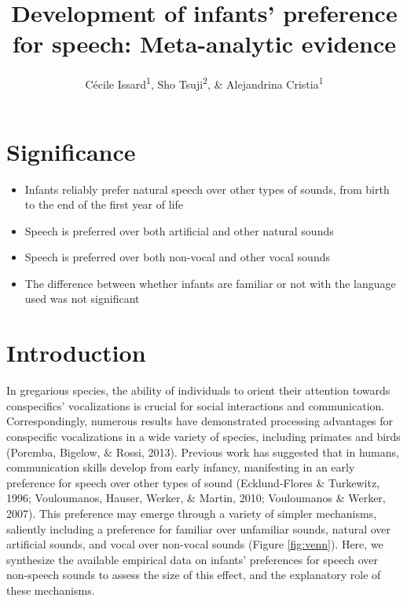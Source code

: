 \documentclass[
  man]{apa6}
\affiliation{
\vspace{0.5cm}
\textsuperscript{1} Laboratoire de Sciences Cognitives et Psycholinguistique, Ecole Normale Supérieure, Département d'Études Cognitives\\\textsuperscript{2} International Research Center for Neurointelligence, The University of Tokyo}
\title{Development of infants' preference for speech: Meta-analytic evidence}
\author{Cécile Issard\textsuperscript{1}, Sho Tsuji\textsuperscript{2}, \& Alejandrina Cristia\textsuperscript{1}}
\date{}
\providecommand{\tightlist}{%
  \setlength{\itemsep}{0pt}\setlength{\parskip}{0pt}}
\begin{document}
\maketitle

\hypertarget{significance}{%
\section{Significance}\label{significance}}

\begin{itemize}
\tightlist
\item
  Infants reliably prefer natural speech over other types of sounds, from birth to the end of the first year of life
\item
  Speech is preferred over both artificial and other natural sounds
\item
  Speech is preferred over both non-vocal and other vocal sounds
\item
  The difference between whether infants are familiar or not with the language used was not significant
\end{itemize}

\hypertarget{introduction}{%
\section{Introduction}\label{introduction}}

In gregarious species, the ability of individuals to orient their attention towards conspecifics' vocalizations is crucial for social interactions and communication. Correspondingly, numerous results have demonstrated processing advantages for conspecific vocalizations in a wide variety of species, including primates and birds (Poremba, Bigelow, \& Rossi, 2013). Previous work has suggested that in humans, communication skills develop from early infancy, manifesting in an early preference for speech over other types of sound (Ecklund-Flores \& Turkewitz, 1996; Vouloumanos, Hauser, Werker, \& Martin, 2010; Vouloumanos \& Werker, 2007). This preference may emerge through a variety of simpler mechanisms, saliently including a preference for familiar over unfamiliar sounds, natural over artificial sounds, and vocal over non-vocal sounds (Figure \ref{fig:venn}). Here, we synthesize the available empirical data on infants' preferences for speech over non-speech sounds to assess the size of this effect, and the explanatory role of these mechanisms.
\end{document}
